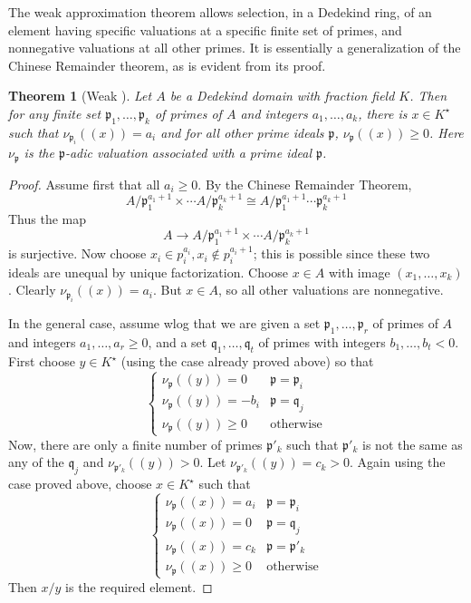 \documentclass[12pt]{article}
\newcommand{\smp}{\mathfrak{p}}
\newcommand{\smq}{\mathfrak{q}}
\newtheorem{thm}{Theorem}
\begin{document}
The weak approximation theorem allows selection, in a Dedekind ring, of an element having specific valuations at a specific finite set of primes, and nonnegative valuations at all other primes. It is essentially a generalization of the Chinese Remainder theorem, as is evident from its proof.
\begin{thm}[Weak ] Let $A$ be a Dedekind domain with fraction field $K$. Then for any finite set $\smp_1,\dotsc,\smp_k$ of primes of $A$ and integers $a_1,\dotsc,a_k$, there is $x\in K^{\star}$ such that $\nu_{\smp_i}((x))=a_i$ and for all other prime ideals $\smp$, $\nu_{\smp}((x))\geq 0$. Here $\nu_{\smp}$ is the $\smp$-adic valuation associated with a prime ideal $\smp$.
\end{thm}
\begin{proof}
Assume first that all $a_i\geq 0$. By the Chinese Remainder Theorem,
\[
  A/\smp_1^{a_1+1}\times\cdots A/\smp_k^{a_k+1}\cong A/\smp_1^{a_1+1}\cdots\smp_k^{a_k+1}
\]
Thus the map
\[
  A\to A/\smp_1^{a_1+1}\times\cdots A/\smp_k^{a_k+1}
\]
is surjective. Now choose $x_i\in p_i^{a_i}, x_i\notin p_i^{a_i+1}$; this is possible since these two ideals are unequal by unique factorization. Choose $x\in A$ with image $(x_1,\dotsc,x_k)$. Clearly $\nu_{\smp_i}((x))=a_i$. But $x\in A$, so all other valuations are nonnegative.

In the general case, assume wlog that we are given a set $\smp_1,\dotsc,\smp_r$ of primes of $A$ and integers $a_1,\dotsc,a_r\geq 0$, and a set $\smq_1,\dotsc,\smq_t$ of primes with integers $b_1,\dotsc,b_t<0$. First choose $y\in K^{\star}$ (using the case already proved above) so that
\[
  \begin{cases}
    \nu_{\smp}((y)) = 0    & \smp = \smp_i \\
    \nu_{\smp}((y)) = -b_i & \smp = \smq_j \\
    \nu_{\smp}((y)) \geq 0 & \text{otherwise}
  \end{cases}
\]
Now, there are only a finite number of primes $\smp'_k$ such that $\smp'_k$ is not the same as any of the $\smq_j$ and $\nu_{\smp'_k}((y))>0$. Let $\nu_{\smp'_k}((y)) = c_k>0$. Again using the case proved above, choose $x\in K^{\star}$ such that
\[
  \begin{cases}
    \nu_{\smp}((x)) = a_i  & \smp = \smp_i \\
    \nu_{\smp}((x)) = 0    & \smp = \smq_j \\
    \nu_{\smp}((x)) = c_k  & \smp = \smp'_k\\
    \nu_{\smp}((x)) \geq 0 & \text{otherwise}
  \end{cases}
\]
Then $x/y$ is the required element.
\end{proof}
\end{document}
